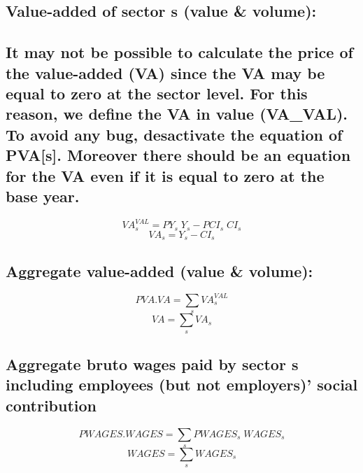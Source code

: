 \documentclass[12pt]{article}
\numberwithin{equation}{section}
\begin{document}
\subsection{Value-added of sector s (value \& volume):}




\subsection{It may not be possible to calculate the price of the value-added (VA) since the VA may be equal to zero at the sector level. For this reason, we define the VA in value (VA_VAL). To avoid any bug, desactivate the equation of PVA[s]. Moreover there should be an equation for the VA even if it is equal to zero at the base year.}



\begin{dmath}
VA^{VAL}_{s} = PY_{s} \; Y_{s} - PCI_{s} \; CI_{s}
\end{dmath}
\begin{dmath}
VA_{s} = Y_{s} - CI_{s}
\end{dmath}





\subsection{Aggregate value-added (value \& volume):}



\begin{dmath}
PVA . VA = \sum_{s} VA^{VAL}_{s}
\end{dmath}
\begin{dmath}
VA = \sum_{s} VA_{s}
\end{dmath}



\subsection{Aggregate bruto wages paid by sector s including employees (but not employers)' social contribution}



\begin{dmath}
PWAGES . WAGES = \sum_{s} PWAGES_{s} \; WAGES_{s}
\end{dmath}
\begin{dmath}
WAGES = \sum_{s} WAGES_{s}
\end{dmath}
\end{document}
